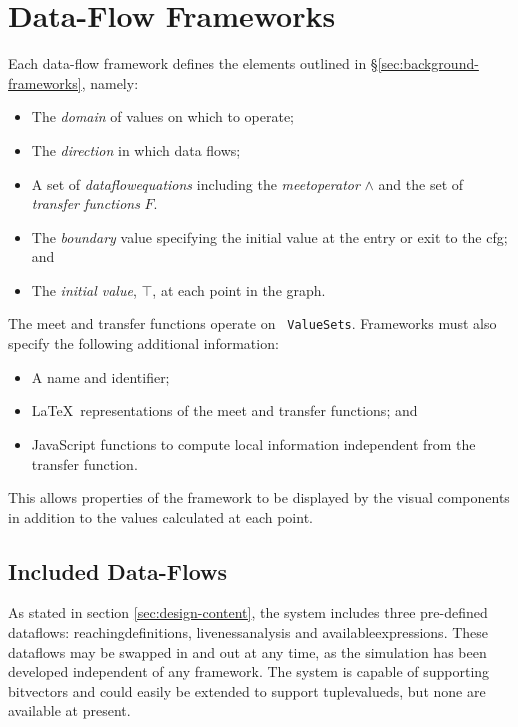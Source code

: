 \documentclass[bsc,twoside,singlespacing,parskip,logo,notimes,normalheadings]{infthesis}
\begin{document}
    \section{Data-Flow Frameworks}\label{sec:impl-dataflows}
    
    Each data-flow framework defines the elements outlined in
    \S\ref{sec:background-frameworks}, namely:

    \begin{itemize}
    \item The {\em \gls{domain}} of values on which to operate;
    \item The {\em \gls{direction}} in which data flows;
    \item A set of {\em \gls{dataflowequations}} including the {\em
        \gls{meetoperator}} $\land$ and the set of {\em
        \gls{transfer} functions} $F$.
    \item The {\em \gls{boundary}} value specifying the initial value
      at the entry or exit to the \gls{cfg}; and
    \item The {\em initial value}, $\top$, at each point in the graph.
    \end{itemize}

    The meet and transfer functions operate on {\tt
      ValueSets}. Frameworks must also specify the following additional
    information:

    \begin{itemize}
    \item A name and identifier;
    \item \LaTeX\ representations of the \gls{meet} and \gls{transfer} functions; and
    \item JavaScript functions to compute local information
      independent from the \gls{transfer} function.
    \end{itemize}

    This allows properties of the framework to be displayed by the
    visual components in addition to the values calculated at each
    point.

    \subsection{Included Data-Flows}\label{sec:impl-included-dataflows}
    As stated in section \ref{sec:design-content}, the system includes
    three pre-defined \gls{dataflow}s: \gls{reachingdefinition}s,
    \gls{livenessanalysis} and \gls{availableexpression}s. These
    \gls{dataflow}s may be swapped in and out at any time, as the
    simulation has been developed independent of any framework. The
    system is capable of supporting \gls{bitvector}s and could easily
    be extended to support \gls{tuplevalued}s, but none are available
    at present.
\end{document}
